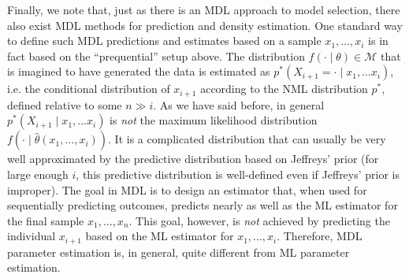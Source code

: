 \documentclass[authoryear]{elsarticle}
\newcommand{\model}{\mathcal{M}}
\begin{document}
Finally, we note that, just as there is an MDL approach to model
selection, there also exist MDL methods for prediction and density
estimation.  One standard way to define such MDL predictions and
estimates based on a sample $x_1, \ldots, x_i$ is in fact based on the
``prequential'' setup above. The distribution $f(\cdot \mid \theta)
\in \model$ that is imagined to have generated the data is estimated
as $p^*(X_{i+1}  = \cdot\mid x_1, \ldots x_i)$, i.e. the conditional
distribution of $x_{i+1}$ according to the NML distribution $p^*$,
defined relative to some $n \gg i$. As we have said before, in general
$p^*(X_{i+1} \mid x_1, \ldots x_i)$ is
{\em not\/} the maximum likelihood distribution $f(\cdot \mid
\hat{\theta}(x_1, \ldots, x_i))$. It is a complicated distribution
that can usually be very well approximated by the predictive
distribution based on Jeffreys' prior (for large enough $i$, this
predictive distribution is well-defined even if Jeffreys' prior is
improper). The goal in MDL is to design an estimator that, when used
for sequentially predicting outcomes, predicts nearly
as well as the ML estimator for the final sample $x_1, \ldots, x_n$.
This goal, however,  is {\em not\/} achieved by predicting the individual $x_{i+1}$
based on the ML estimator for $x_1, \ldots, x_i$. Therefore, MDL parameter
estimation is, in general, quite different from ML parameter
estimation.
\end{document}
